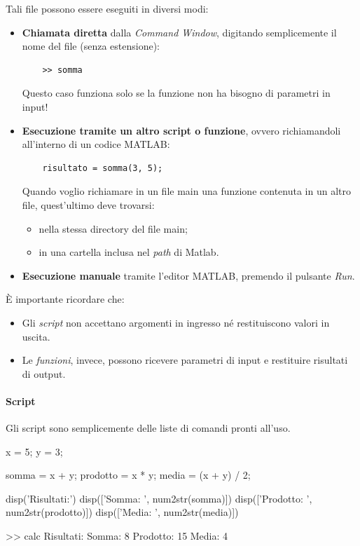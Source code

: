 Tali file possono essere eseguiti in diversi modi:
\begin{itemize}
    \item \textbf{Chiamata diretta} dalla \emph{Command Window}, digitando semplicemente il nome del file (senza estensione):
    \begin{verbatim}
    >> somma
    \end{verbatim}
    \begin{note}
    Questo caso funziona solo se la funzione non ha bisogno di parametri in input!
    \end{note}

    \item \textbf{Esecuzione tramite un altro script o funzione}, ovvero richiamandoli all'interno di un codice MATLAB:
    \begin{verbatim}
    risultato = somma(3, 5);
    \end{verbatim}
    \begin{note}
    Quando voglio richiamare in un file main una funzione contenuta in un altro file, quest'ultimo deve trovarsi:
    \begin{itemize}
        \item nella stessa directory del file main;
        \item in una cartella inclusa nel \emph{path} di Matlab.
    \end{itemize}
    \end{note}

    \item \textbf{Esecuzione manuale} tramite l'editor MATLAB, premendo il pulsante \emph{Run}.
\end{itemize}

È importante ricordare che:
\begin{itemize}
    \item Gli \emph{script} non accettano argomenti in ingresso né restituiscono valori in uscita.
    \item Le \emph{funzioni}, invece, possono ricevere parametri di input e restituire risultati di output.
\end{itemize}

\paragraph{Script}
Gli script sono semplicemente delle liste di comandi pronti all'uso.
\begin{matlab}
x = 5;
y = 3;

somma = x + y;
prodotto = x * y;
media = (x + y) / 2;

disp('Risultati:')
disp(['Somma: ', num2str(somma)])
disp(['Prodotto: ', num2str(prodotto)])
disp(['Media: ', num2str(media)])
\end{matlab}
\begin{matlabconsole}
>> calc
Risultati:
Somma: 8
Prodotto: 15
Media: 4
\end{matlabconsole}

